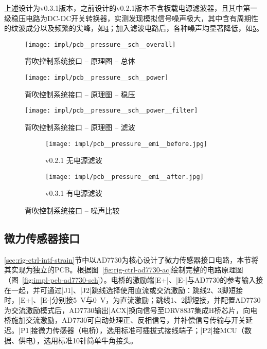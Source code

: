 上述设计为v0.3.1版本，之前设计的v0.2.1版本不含板载电源滤波器，且其中第一级稳压电路为DC-DC开关转换器，实测发现模拟信号噪声极大，其中含有周期性的纹波成分以及频繁的尖峰，如\ref{fig:impl-pcb-pressure-emi-before}；加入滤波电路后，各种噪声均显著降低，如\ref{fig:impl-pcb-pressure-emi-after}。

\begin{figure}[hbp]
\centering
\texttt{[image: impl/pcb\_\_pressure\_\_sch\_\_overall]}
\caption{背吹控制系统接口 -- 原理图 -- 总体}
\label{fig:impl-pcb-pressure-sch-overall}
\end{figure}

\begin{figure}[hbp]
\centering
\texttt{[image: impl/pcb\_\_pressure\_\_sch\_\_power]}
\caption{背吹控制系统接口 -- 原理图 -- 稳压}
\label{fig:impl-pcb-pressure-sch-power}
\end{figure}

\begin{figure}[p]
\centering
\texttt{[image: impl/pcb\_\_pressure\_\_sch\_\_power\_\_filter]}
\caption{背吹控制系统接口 -- 原理图 -- 滤波}
\label{fig:impl-pcb-pressure-sch-power-filter}
\end{figure}

\begin{figure}[p]
  \centering
  \begin{subfigure}{1\textwidth}
    \centering
    \texttt{[image: impl/pcb\_\_pressure\_\_emi\_\_before.jpg]}
    \caption{v0.2.1 无电源滤波}
    \label{fig:impl-pcb-pressure-emi-before}
  \end{subfigure}
  \par\bigskip
  \begin{subfigure}{1\textwidth}
    \centering
    \texttt{[image: impl/pcb\_\_pressure\_\_emi\_\_after.jpg]}
    \caption{v0.3.1 有电源滤波}
    \label{fig:impl-pcb-pressure-emi-after}
  \end{subfigure}
\caption{背吹控制系统接口 -- 噪声比较}
\label{fig:impl-pcb-pressure-emi}
\end{figure}


\clearpage


\subsection{微力传感器接口}\label{sec:impl-pcb-ad7730}

\ref{sec:rig-ctrl-intf-strain}节中以AD7730为核心设计了微力传感器接口电路，本节将其实现为独立的PCB。根据图~\ref{fig:rig-ctrl-ad7730-ac}绘制完整的电路原理图（图~\ref{fig:impl-pcb-ad7730-sch}）。电桥的激励端\bverb|E+|、\bverb|E-|与AD7730的参考输入接在一起，并可通过\bverb|J1|、\bverb|J2|跳线选择使用直流或交流激励：跳线2、3脚短接时，\bverb|E+|、\bverb|E-|分别接\SI{+5}{\V}与\SI{0}{\V}，为直流激励；跳线1、2脚短接，并配置AD7730为交流激励模式后，AD7730输出\bverb|ACX|换向信号至DRV8837集成H桥芯片，向电桥施加交流激励，AD7730可自动处理正、反相信号，并补偿信号传输与开关延迟。\bverb|P1|接微力传感器（电桥），选用标准可插拔式接线端子；\bverb|P2|接MCU（数据、供电），选用标准10针简单牛角接头。

